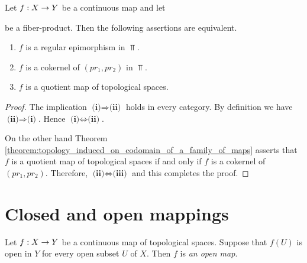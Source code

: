 \begin{proposition}\label{proposition:regular_epimorphisms_are_quotients}
	Let $f:X\rightarrow Y$ be a continuous map and let
	\begin{center}
	\end{center}
	be a fiber-product. Then the following assertions are equivalent.
	\begin{enumerate}[label=\emph{\textbf{(\roman*)}}, leftmargin=3.0em]
		\item $f$ is a regular epimorphism in $\Top$.
		\item $f$ is a cokernel of $(pr_1,pr_2)$ in $\Top$.
		\item $f$ is a quotient map of topological spaces.
	\end{enumerate}
\end{proposition}
\begin{proof}
	The implication $\textbf{(i)} \Rightarrow \textbf{(ii)}$ holds in every category. By definition we have $\textbf{(ii)} \Rightarrow \textbf{(i)}$. Hence $\textbf{(i)}\Leftrightarrow \textbf{(ii)}$.

	On the other hand Theorem \ref{theorem:topology_induced_on_codomain_of_a_family_of_maps} asserts that $f$ is a quotient map of topological spaces if and only if $f$ is a cokernel of $(pr_1,pr_2)$. Therefore, $\textbf{(ii)}\Leftrightarrow \textbf{(iii)}$ and this completes the proof.
\end{proof}

\section{Closed and open mappings}

\begin{definition}
	Let $f:X \rightarrow Y$ be a continuous map of topological spaces. Suppose that $f(U)$ is open in $Y$ for every open subset $U$ of $X$. Then $f$ is \textit{an open map}.
\end{definition}

